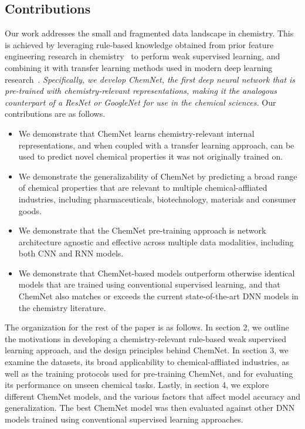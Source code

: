 \documentclass[sigconf]{acmart}
\begin{document}
\subsection{Contributions}
Our work addresses the small and fragmented data landscape in chemistry. This is achieved by leveraging rule-based knowledge obtained from prior feature engineering research in chemistry~\cite{cherkasov2014} to perform weak supervised learning, and combining it with transfer learning methods used in modern deep learning research~\cite{oquab2014}. \textit{Specifically, we develop ChemNet, the first deep neural network that is pre-trained with chemistry-relevant representations, making it the analogous counterpart of a ResNet or GoogleNet for use in the chemical sciences.} Our contributions are as follows. 
\begin{itemize}

	\item We demonstrate that ChemNet learns chemistry-relevant internal representations, and when coupled with a transfer learning approach, can be used to predict novel chemical properties it was not originally trained on.
	\item We demonstrate the generalizability of ChemNet by predicting a broad range of chemical properties that are relevant to multiple chemical-affliated industries, including pharmaceuticals, biotechnology, materials and consumer goods.
	\item We demonstrate that the ChemNet pre-training approach is network architecture agnostic and effective across multiple data modalities, including both CNN and RNN models.
	\item We demonstrate that ChemNet-based models outperform otherwise identical models that are trained using conventional supervised learning, and that ChemNet also matches or exceeds the current state-of-the-art DNN models in the chemistry literature.
\end{itemize}


The organization for the rest of the paper is as follows. In section 2, we outline the motivations in developing a chemistry-relevant rule-based weak supervised learning approach, and the design principles behind ChemNet. In section 3, we examine the datasets, its broad applicability to chemical-affliated industries, as well as the training protocols used for pre-training ChemNet, and for evaluating its performance on unseen chemical tasks. Lastly, in section 4, we explore different ChemNet models, and the various factors that affect model accuracy and generalization. The best ChemNet model was then evaluated against other DNN models trained using conventional supervised learning approaches.
\end{document}
